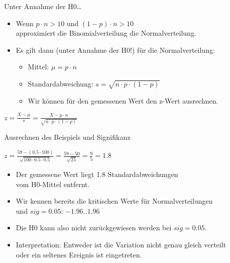 \begin{frame}
  {Unter Annahme der H0\ldots}
  \begin{itemize}[<+->]
    \item Wenn \alert{$p\cdot n>10$ und $(1-p)\cdot n>10$}\\
      approximiert die Binomialverteilung die Normalverteilung.
    \item Es gilt dann (unter Annahme der H0!) für die Normalverteilung:
      \begin{itemize}
	\item Mittel: \alert{$\mu=p\cdot n$}
	\item Standardabweichung: \alert{$s=\sqrt{n\cdot p\cdot(1-p)}$}
	\item Wir können für den gemessenen Wert den z-Wert ausrechnen.
      \end{itemize}
  \end{itemize}
  \pause
  \vspace{0.5cm}
  \begin{center}
    \alert{$z=\frac{X-\mu}{s}=\frac{X-p\cdot n}{\sqrt{n\cdot p\cdot (1-p)}}$}
  \end{center}
\end{frame}

\begin{frame}
  {Ausrechnen des Beispiels und Signifikanz}
  \begin{center}
    $z=\frac{59-(0.5\cdot 100)}{\sqrt{100\cdot 0.5\cdot 0.5}}=\frac{59-50}{\sqrt{25}}=\frac{9}{5}=1.8$
  \end{center}
  \pause
  \begin{itemize}[<+->]
    \item Der gemessene Wert liegt 1.8 Standardabweichungen\\
      vom H0-Mittel entfernt.
    \item Wir kennen bereits die kritischen Werte für Normalverteilungen\\
      und $sig=0.05$: \alert{$-1.96 .. 1.96$}
    \item Die H0 kann also nicht zurückgewiesen werden bei $sig=0.05$.
      \vspace{\baselineskip}
    \item Interpretation: Entweder ist die Variation nicht genau gleich verteilt\\
      \alert{oder ein seltenes Ereignis ist eingetreten.}
  \end{itemize}
\end{frame}

